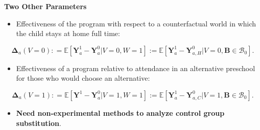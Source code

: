 \documentclass[static]{JJH-Beamer}
\begin{document}
\begin{frame}

\begin{center}
\textbf{Two Other Parameters}
\end{center}

\begin{itemize}
\item Effectiveness of the program with respect to a counterfactual world in which the child stays at home full time:
\end{itemize}
\begin{equation}\label{eq:influenza}
\bm{\Delta}_a \left(V = 0 \right) : =   \mathbb{E} \left[ \bm{Y}^1_a - \bm{Y}^0_a | V = 0, W = 1 \right] := \mathbb{E} \left[\bm{Y}^1_a - \bm{Y}^0_{a,H} | V = 0, 	\bm{B} \in \mathcal{B}_0 \right].
\end{equation}

\end{frame}

\begin{frame}

\begin{itemize}
\item Effectiveness of a program relative to attendance in an alternative preschool for those who would choose an alternative:
\end{itemize}	
	\begin{equation}\label{eq:smallpox}
	\bm{\Delta}_a \left( V =1 \right) : =   \mathbb{E} \left[ \bm{Y}^1- \bm{Y}^0_a | V = 1, W = 1 \right] := \mathbb{E}  \left[\bm{Y}^1_a - \bm{Y}^0_{a,C} | V = 1, \bm{B} \in \mathcal{B}_0 \right].
	\end{equation}
	\mode<presentation>{\end{footnotesize}}
	\mode<article>{\end{large}}
\begin{itemize}
\item \textbf{Need non-experimental methods to analyze control group substitution}.
\end{itemize}

\end{frame}
\end{document}
